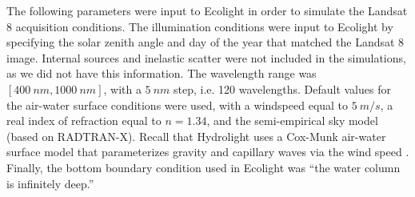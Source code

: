 \documentclass[onecolumn,3p,letterpaper,11pt]{elsarticle}
\begin{document}
The following parameters were input to Ecolight in order to simulate the Landsat 8 acquisition conditions. The illumination conditions were input to Ecolight by specifying the solar zenith angle and day of the year that matched the Landsat 8 image. Internal sources and inelastic scatter were not included in the simulations, as we did not have this information. The wavelength range was $[400~nm,1000~nm]$, with a $5~nm$ step, i.e. 120 wavelengths. Default values for the air-water surface conditions were used, with a windspeed equal to $5~m/s$, a real index of refraction equal to $n=1.34$, and the semi-empirical sky model (based on RADTRAN-X). Recall that Hydrolight uses a Cox-Munk air-water surface model that parameterizes gravity and capillary waves via the wind speed \citep{MobleyHEtech}. Finally, the bottom boundary condition used in Ecolight was ``the water column is infinitely deep.''
\end{document}
